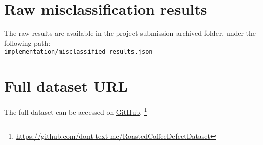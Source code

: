 \section{Raw misclassification results}
\label{sec:raw-misclassification-results}
The raw results are available in the project submission archived folder, under the following path: \\
\verb|implementation/misclassified_results.json|

\section{Full dataset URL}
\label{sec:full-dataset-url}
The full dataset can be accessed on \href{https://github.com/dont-text-me/RoastedCoffeeDefectDataset}{GitHub}.
\footnote{\url{https://github.com/dont-text-me/RoastedCoffeeDefectDataset}}